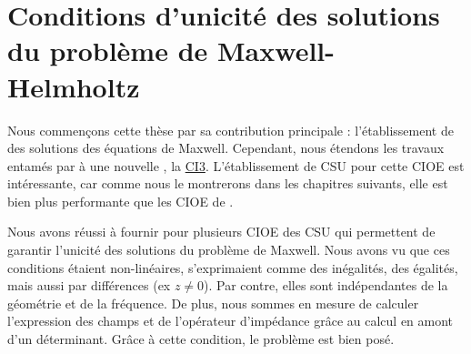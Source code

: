 \chapter[Unicité des solutions de Maxwell]{Conditions d'unicité des solutions du problème de Maxwell-Helmholtz}
\label{sec:csu}
\minitoc
\newpage
{}
Nous commençons cette thèse par sa contribution principale : l'établissement de  des solutions des équations de Maxwell.
Cependant, nous étendons les travaux entamés par \cite{stupfel_sufficient_2011} à une nouvelle , la \hyperlink{ci3}{CI3}. L'établissement de CSU pour cette CIOE est intéressante, car comme nous le montrerons dans les chapitres suivants, elle est bien plus performante que les CIOE de \cite{stupfel_sufficient_2011}.





Nous avons réussi à fournir pour plusieurs CIOE des CSU qui permettent de garantir l'unicité des solutions du problème de Maxwell. Nous avons vu que ces conditions étaient non-linéaires, s'exprimaient comme des inégalités, des égalités, mais aussi par différences (ex \(z\not=0\)). Par contre, elles sont indépendantes de la géométrie et de la fréquence.
De plus, nous sommes en mesure de calculer l'expression des champs et de l'opérateur d'impédance grâce au calcul en amont d'un déterminant. Grâce à cette condition, le problème est bien posé.